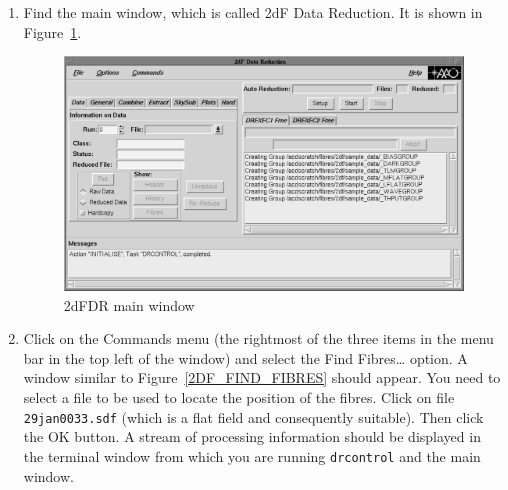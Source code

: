 \documentclass[twoside,11pt]{starlink}
\begin{document}
\begin{enumerate}
  \item Find the main window, which is called \textsf{2dF Data Reduction}.
   It is shown in Figure~\ref{2DF_DATA_REDUCTION}.

  \begin{figure}[htbp]
     \centering
     \includegraphics[totalheight=3.5in]{sc14_2df_data_reduction}
     \caption{2dFDR main window
     \label{2DF_DATA_REDUCTION} }
  \end{figure}

  \item Click on the \textsf{Commands} menu (the rightmost of the three
   items in the menu bar in the top left of the window) and
   select the \textsf{Find Fibres\ldots} option.  A window similar to
   Figure~\ref{2DF_FIND_FIBRES} should appear.  You need to select a
   file to be used to locate the position of the fibres.  Click on
   file \texttt{29jan0033.sdf} (which is a flat field and consequently
   suitable).  Then click the \textsf{OK} button.  A stream of processing
   information should be displayed in the terminal window from which
   you are running \texttt{drcontrol} and the main window.


\end{enumerate}
\end{document}
